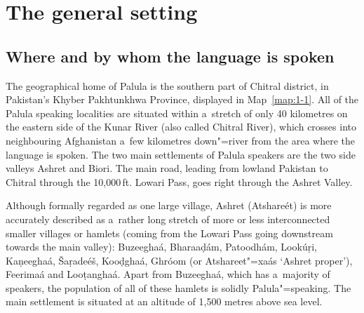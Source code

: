 \section{The general setting}
\label{sec:1-2}
\subsection{Where and by whom the language is spoken}
\label{subsec:1-2-1}

The geographical home of Palula is the southern part of Chitral district, in Pakistan's Khyber Pakhtunkhwa Province, displayed in Map~\ref{map:1-1}. All of the Palula speaking localities are
situated within a~stretch of only 40 kilometres on the eastern side of the Kunar River (also called
Chitral River), which crosses into neighbouring Afghanistan a~few kilometres down"=river from the
area where the language is spoken. The two main settlements of Palula speakers are the two side valleys Ashret and Biori. The main road, leading from lowland Pakistan to Chitral through the 10,000\,ft. Lowari Pass, goes right through the Ashret Valley. 


Although formally regarded as one large village, Ashret (Atshareét) is more accurately described as a~rather long stretch of more or less interconnected smaller villages or hamlets (coming from the Lowari Pass going downstream towards the main valley): Buzeeghaá, Bharaaḍám, Patoodhám, Lookúṛi, Kaṇeeghaá, Šaṛadeéš, Kooḍghaá, Ghróom (or Atshareet"=xaás `Ashret proper'), Feerimaá and Looṭanghaá. Apart from Buzeeghaá, which has a~majority of \iliPashto speakers, the population of all of these hamlets is solidly Palula"=speaking. The main settlement is situated at an altitude of 1,500 metres above sea level.


